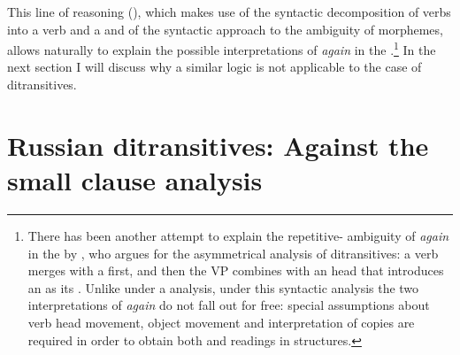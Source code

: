 \documentclass[output=paper]{langscibook}
\begin{document}
This line of reasoning (\citealt{Beck-Johnson2004}), which makes use of the syntactic decomposition of  verbs into a verb and a  and of the syntactic approach to the ambiguity of  morphemes, allows naturally to explain the possible interpretations of  \textit{again} in the .\footnote{There has been another attempt to explain the repetitive- ambiguity of \textit{again} in the   by \citet{Bruening2010}, who argues for the asymmetrical  analysis of  ditransitives: a verb merges with a  first, and then the VP combines with an  head that introduces an  as its . Unlike under a  analysis, under this syntactic analysis the two interpretations of \textit{again} do not fall out for free: special assumptions about verb head movement, object movement and interpretation of copies are required in order to obtain both  and  readings in  structures.} In the next section I will discuss why a similar logic is not applicable to the case of  ditransitives.


\section{Russian ditransitives: Against the small clause analysis}\label{s3}
\end{document}

